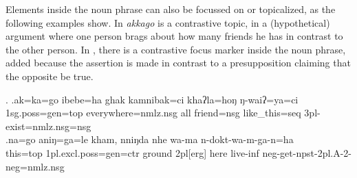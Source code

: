 Elements inside the noun phrase can also be focussed on or topicalized, as the following examples show. In \Next[a] \emph{akkago}  is a contrastive topic, in a (hypothetical) argument where one person brags about how many friends he has in contrast to the other person. In \Next[b], there is a contrastive focus marker inside the noun phrase, added because the assertion is made in contrast to a presupposition claiming that the opposite be true.
  
  \ex. \ag.ak=ka=go              ibebe=ha            ghak kamnibak=ci    khaʔla=hoŋ       ŋ-waiʔ=ya=ci\\
  {\sc 1sg.poss=gen=top} everywhere{\sc =nmlz.nsg} all friend{\sc =nsg} like\_this{\sc =seq} {\sc 3pl-}exist{\sc [npst]=nmlz.nsg=nsg}\\
   
  \bg.na=go       aniŋ=ga=le                     kham, nniŋda  nhe  wa-ma      n-dokt-wa-m-ga-n=ha\\
 this{\sc =top} {\sc 1pl.excl.poss=gen=ctr} ground {\sc 2pl[erg]} here live{\sc -inf} {\sc neg-}get{\sc-npst-2pl.A-2-neg=nmlz.nsg}\\
   
 

 
